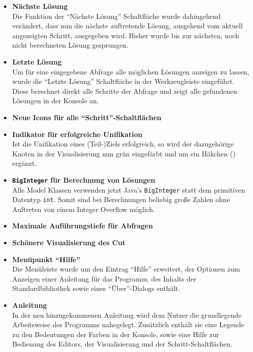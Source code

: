 \documentclass[parskip=full,11pt,twoside]{scrartcl}
\begin{document}
\begin{itemize}
  \item \textbf{Nächste Lösung}\\
        Die Funktion der \enquote{Nächste Lösung} Schaltfläche wurde dahingehend verändert, dass nun die nächste auftretende Lösung, ausgehend vom aktuell angezeigten Schritt, ausgegeben wird. Bisher wurde bis zur nächsten, noch nicht berechneten Lösung gesprungen.
  \item \textbf{Letzte Lösung}\\
        Um für eine eingegebene Abfrage alle möglichen Lösungen anzeigen zu lassen, wurde die \enquote{Letzte Lösung} Schaltfläche in der Werkzeugleiste eingeführt. Diese berechnet direkt alle Schritte der Abfrage und zeigt alle gefundenen Lösungen in der Konsole an.
  \item \textbf{Neue Icons für alle \enquote{Schritt}-Schaltflächen}\\
  \item \textbf{Indikator für erfolgreiche Unifikation}\\
        Ist die Unifikation eines (Teil-)Ziels erfolgreich, so wird der dazugehörige Knoten in der Visualisierung nun grün eingefärbt und um ein Häkchen () ergänzt.
  \item \textbf{\texttt{BigInteger} für Berechnung von Lösungen}\\
        Alle Model Klassen verwenden jetzt Java's \texttt{BigInteger} statt dem primitiven Datentyp \texttt{int}. Somit sind bei Berechnungen beliebig große Zahlen ohne Auftreten von einem Integer Overflow möglich.
  \item \textbf{Maximale Auführungstiefe für Abfragen}\\
  \item \textbf{Schönere Visualisierung des Cut}\\
  \item \textbf{Menüpunkt \enquote{Hilfe}}\\
        Die Menüleiste wurde um den Eintrag \enquote{Hilfe} erweitert, der Optionen zum Anzeigen einer Anleitung für das Programm, des Inhalts der Standardbibliothek sowie eines \enquote{Über}-Dialogs enthält.
  \item \textbf{Anleitung}\\
        In der neu hinzugekommenen Anleitung wird dem Nutzer die grundlegende Arbeitsweise des Programms nahegelegt. Zusätzlich enthält sie eine Legende zu den Bedeutungen der Farben in der Konsole, sowie eine Hilfe zur Bedienung des Editors, der Visualisierung und der Schritt-Schaltflächen.

\end{itemize}
\end{document}
